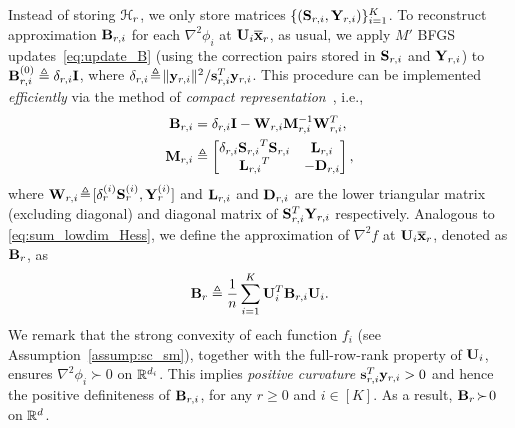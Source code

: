 \documentclass[10pt,twocolumn,journal]{IEEEtran}
\begin{document}
Instead of storing $\mathcal{H}_r$, we only store matrices $\{(\mathbf{S}_{r,i},\mathbf{Y}_{r,i})\}_{i=1}^K$. 
To reconstruct approximation $\mathbf{B}_{r,i}$ for each $\nabla^2 \phi_i$ at $\mathbf{U}_i\overline{\bf x}_r$, as usual, we apply $M'$ BFGS updates~\eqref{eq:update_B} (using the correction pairs stored in $\mathbf{S}_{r,i}$ and $\mathbf{Y}_{r,i}$) to $\mathbf{B}_{r,i}^{(0)}\triangleq \delta_{r,i}\mathbf{I}$, where $\delta_{r,i}\!\triangleq\! \Vert\mathbf{y}_{r,i}\Vert^2/{\mathbf{s}_{r,i}^T\mathbf{y}_{r,i}}$. This procedure can be implemented {\em efficiently} via the method of {\em compact representation}~\cite{Nocedal_06}, i.e., 
\begin{align}
\mathbf{B}_{r,i} &= \delta_{r,i}\mathbf{I} - \mathbf{W}_{r,i}\mathbf{M}_{r,i}^{-1}\mathbf{W}_{r,i}^T,\label{eq:compact_rep}\\
\mathbf{M}_{r,i} &\triangleq \begin{bmatrix}
\delta_{r,i}{\mathbf{S}_{r,i}}^T\mathbf{S}_{r,i} &\mathbf{L}_{r,i}\\
{\mathbf{L}_{r,i}}^T& -\mathbf{D}_{r,i}
\end{bmatrix},
\end{align}
where $\mathbf{W}_{r,i}\!\triangleq\! [\delta_r^{(i)}{\mathbf{S}_r^{(i)}},\mathbf{Y}_r^{(i)}]$ and $\mathbf{L}_{r,i}$ and $\mathbf{D}_{r,i}$ are the lower triangular matrix (excluding diagonal) and diagonal matrix of $\mathbf{S}_{r,i}^T\mathbf{Y}_{r,i}$ respectively. Analogous to \eqref{eq:sum_lowdim_Hess}, we define the approximation of $\nabla^2 f$ at $\mathbf{U}_i\overline{\bf x}_r$, denoted as $\mathbf{B}_r$, as 
\begin{equation}
 \mathbf{B}_r \triangleq \frac{1}{n}\sum_{i=1}^K \mathbf{U}_i^T\mathbf{B}_{r,i}\mathbf{U}_i.\label{eq:def_B_r} 
\end{equation}
We remark that the strong convexity of each function $f_i$ (see Assumption~\ref{assump:sc_sm}), together with the full-row-rank property of $\mathbf{U}_i$, ensures $\nabla^2 \phi_i\!\succ\! 0$ on $\mathbb{R}^{d_i}$. This implies {\em positive curvature} $\mathbf{s}_{r,i}^T\mathbf{y}_{r,i}>0$ and hence the positive definiteness of $\mathbf{B}_{r,i}$, for any $r\!\ge\! 0$ and $i\!\in\![K]$. As a result, $\mathbf{B}_r\!\succ\! 0$ on $\mathbb{R}^d$. 
\end{document}
